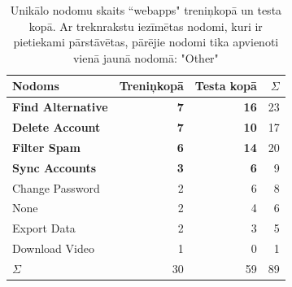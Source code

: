 \begin{table}[htbp]
  \centering
  \caption{Unikālo nodomu skaits ``webapps" treniņkopā un testa kopā. Ar treknrakstu iezīmētas nodomi, kuri ir pietiekami pārstāvētas, pārējie nodomi tika apvienoti vienā jaunā nodomā: "Other"}
    \begin{tabular}{lrrr} \toprule
    Nodoms & Treniņkopā & Testa kopā & $\Sigma$ \\\midrule
    \textbf{Find Alternative} & \textbf{7} & \textbf{16} & 23\\
    \textbf{Delete Account} & \textbf{7} & \textbf{10} & 17\\
    \textbf{Filter Spam} & \textbf{6} & \textbf{14} & 20 \\
    \textbf{Sync Accounts} & \textbf{3} & \textbf{6} & 9 \\
    Change Password & 2     & 6 & 8\\
    None  & 2     & 4 & 6\\
    Export Data & 2     & 3 & 5 \\
    Download Video & 1     & 0 & 1\\
    $\Sigma$ & 30    & 59 & 89 \\\bottomrule
    \end{tabular}%
  \label{tab:webapps-labels}%
\end{table}%




